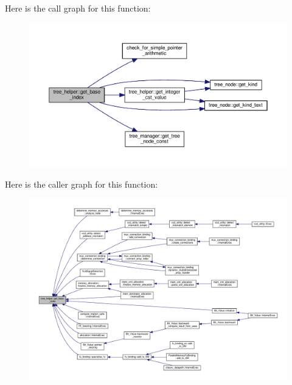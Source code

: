 Here is the call graph for this function\+:
\nopagebreak
\begin{figure}[H]
\begin{center}
\leavevmode
\includegraphics[width=350pt]{d7/d99/classtree__helper_a1f4f49f85ee4642ce275b23f29b252eb_cgraph}
\end{center}
\end{figure}
Here is the caller graph for this function\+:
\nopagebreak
\begin{figure}[H]
\begin{center}
\leavevmode
\includegraphics[width=350pt]{d7/d99/classtree__helper_a1f4f49f85ee4642ce275b23f29b252eb_icgraph}
\end{center}
\end{figure}
\mbox{\label{classtree__helper_afcc09a263c77cec37dd370199cc7b81f}} 
